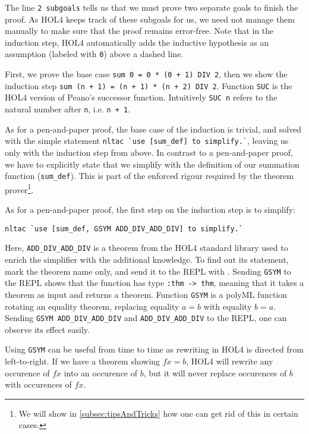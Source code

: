 The line \lstinline{2 subgoals} tells us that we must prove two separate goals
to finish the proof.
As HOL4 keeps track of these subgoals for us, we need not manage them manually
to make sure that the proof remains error-free.
Note that in the induction step, HOL4 automatically adds the inductive
hypothesis as an assumption (labeled with \lstinline{0}) above a dashed line.

First, we prove the base case \lstinline{sum 0 = 0 * (0 + 1) DIV 2}, then we
show the induction step \lstinline{sum (n + 1) = (n + 1) * (n + 2) DIV 2}.
Function \lstinline{SUC} is the HOL4 version of Peano's successor function.
Intuitively \lstinline{SUC n} refers to the natural number after \lstinline{n},
i.e. \lstinline{n + 1}.

As for a pen-and-paper proof, the base case of the induction is trivial, and
solved with the simple statement \lstinline{nltac `use [sum_def] to simplify.`},
leaving us only with the induction step from above.
In contrast to a pen-and-paper proof, we have to explicitly state that we
simplify with the definition of our summation function (\lstinline{sum_def}).
This is part of the enforced rigour required by the theorem prover\footnote{
We will show in \autoref{subsec:tipsAndTricks} how one can get rid of this in certain cases.}.

As for a pen-and-paper proof, the first step on the induction step is to
simplify:
\begin{lstlisting}
nltac `use [sum_def, GSYM ADD_DIV_ADD_DIV] to simplify.`
\end{lstlisting}

Here, \lstinline{ADD_DIV_ADD_DIV} is a theorem from the HOL4 standard library
used to enrich the simplifier with the additional knowledge.
To find out its statement, mark the theorem name only, and send it to the
REPL with .
Sending \lstinline{GSYM} to the REPL shows that the function has type
\lstinline{:thm -> thm}, meaning that it takes a theorem as input and returns a
theorem.
Function \lstinline{GSYM} is a polyML function rotating an equality theorem,
replacing equality $a = b$ with equality $b = a$.
Sending \lstinline{GSYM ADD_DIV_ADD_DIV} and \lstinline{ADD_DIV_ADD_DIV} to the REPL, one can
observe its effect easily.

Using \lstinline{GSYM} can be useful from time to time as rewriting in HOL4 is
directed from left-to-right.
If we have a theorem showing $f x = b$, HOL4 will rewrite any occurence of
$f x$ into an occurence of $b$, but it will never replace occurences of $b$
with occurences of $f x$.

